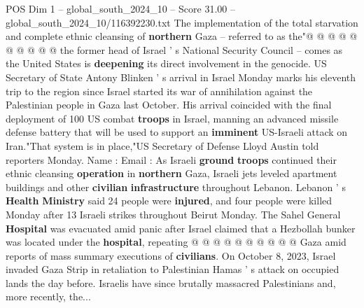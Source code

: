 \begin{textsample}{POS Dim 1 – global\_south\_2024\_10 – Score 31.00 – global\_south\_2024\_10/116392230.txt}
The implementation of the total starvation and complete ethnic cleansing of \textbf{northern} Gaza -- referred to as the"@ @ @ @ @ @ @ @ @ @ the former head of Israel ' s National Security Council -- comes as the United States is \textbf{deepening} its direct involvement in the genocide.
US Secretary of State Antony Blinken ' s arrival in Israel Monday marks his eleventh trip to the region since Israel started its war of annihilation against the Palestinian people in Gaza last October.
His arrival coincided with the final deployment of 100 US combat \textbf{troops} in Israel, manning an advanced missile defense battery that will be used to support an \textbf{imminent} US-Israeli attack on Iran."That system is in place,"US Secretary of Defense Lloyd Austin told reporters Monday.
Name : Email : As Israeli \textbf{ground} \textbf{troops} continued their ethnic cleansing \textbf{operation} in \textbf{northern} Gaza, Israeli jets leveled apartment buildings and other \textbf{civilian} \textbf{infrastructure} throughout Lebanon.
Lebanon ' s \textbf{Health} \textbf{Ministry} said 24 people were \textbf{injured}, and four people were killed Monday after 13 Israeli strikes throughout Beirut Monday.
The Sahel General \textbf{Hospital} was evacuated amid panic after Israel claimed that a Hezbollah bunker was located under the \textbf{hospital}, repeating @ @ @ @ @ @ @ @ @ @ Gaza amid reports of mass summary executions of \textbf{civilians}.
On October 8, 2023, Israel invaded Gaza Strip in retaliation to Palestinian Hamas ' s attack on occupied lands the day before.
Israelis have since brutally massacred Palestinians and, more recently, the...

\end{textsample}
